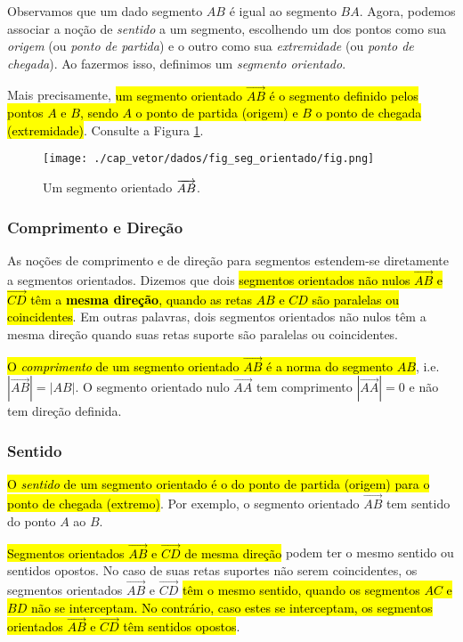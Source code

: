 Observamos que um dado segmento $AB$ é igual ao segmento $BA$. Agora, podemos associar a noção de \emph{sentido} a um segmento, escolhendo um dos pontos como sua \emph{origem} (ou \emph{ponto de partida}) e o outro como sua \emph{extremidade} (ou \emph{ponto de chegada}). Ao fazermos isso, definimos um \emph{segmento orientado}.

Mais precisamente, \hl{um segmento orientado $\overrightarrow{AB}$ é o segmento definido pelos pontos $A$ e $B$, sendo $A$ o ponto de partida (origem) e $B$ o ponto de chegada (extremidade)}. Consulte a Figura \ref{cap_vetor_sec_segorien:fig:seg_orientado}.

\begin{figure}[h]
  \centering
  \texttt{[image: ./cap\_vetor/dados/fig\_seg\_orientado/fig.png]}
  \caption{Um segmento orientado $\protect\overrightarrow{AB}$.}
  \label{cap_vetor_sec_segorien:fig:seg_orientado}
\end{figure}

\subsubsection{Comprimento e Direção}

As noções de comprimento e de direção para segmentos estendem-se diretamente a segmentos orientados. Dizemos que dois \hl{segmentos orientados não nulos $\overrightarrow{AB}$ e $\overrightarrow{CD}$ têm a \textbf{mesma direção}, quando as retas $AB$ e $CD$ são paralelas ou coincidentes}. Em outras palavras, dois segmentos orientados não nulos têm a mesma direção quando suas retas suporte são paralelas ou coincidentes.

  \hl{O \emph{comprimento} de um segmento orientado $\overrightarrow{AB}$ é a norma do segmento $AB$}, i.e. $\left|\overrightarrow{AB}\right| = |AB|$. O segmento orientado nulo $\overrightarrow{AA}$ tem comprimento $\left|\overrightarrow{AA}\right|=0$ e não tem direção definida.

\subsubsection{Sentido}

\hl{O \emph{sentido} de um segmento orientado é o do ponto de partida (origem) para o ponto de chegada (extremo)}. Por exemplo, o segmento orientado $\overrightarrow{AB}$ tem sentido do ponto $A$ ao $B$.

\hl{Segmentos orientados $\overrightarrow{AB}$ e $\overrightarrow{CD}$ de mesma direção} podem ter o mesmo sentido ou sentidos opostos. No caso de suas retas suportes não serem coincidentes, os segmentos orientados $\overrightarrow{AB}$ e $\overrightarrow{CD}$ \hl{têm o mesmo sentido, quando os segmentos $AC$ e $BD$ não se interceptam. No contrário, caso estes se interceptam, os segmentos orientados $\overrightarrow{AB}$ e $\overrightarrow{CD}$ têm sentidos opostos}. 

